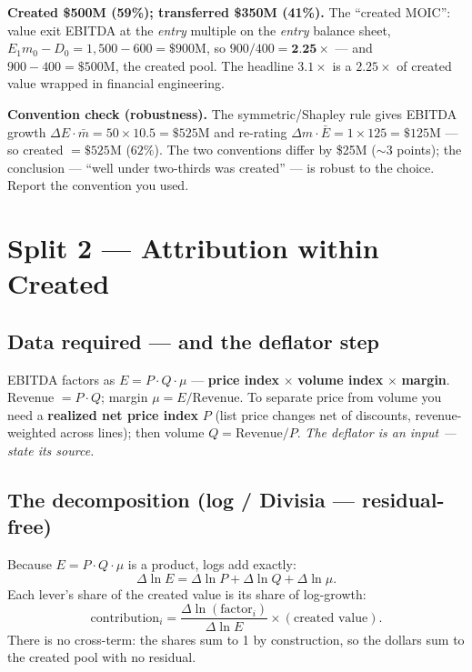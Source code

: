 \documentclass[11pt]{article}
\begin{document}
\textbf{Created \$500M (59\%); transferred \$350M (41\%).} The ``created MOIC'': value exit
EBITDA at the \emph{entry} multiple on the \emph{entry} balance sheet,
$E_1 m_0-D_0=1{,}500-600=\$900\text{M}$, so $900/400=\textbf{2.25}\times$ --- and
$900-400=\$500\text{M}$, the created pool. The headline $3.1\times$ is a $2.25\times$ of
created value wrapped in financial engineering.

\begin{note}
\textbf{Convention check (robustness).} The symmetric/Shapley rule gives EBITDA growth
$\Delta E\cdot\bar m=50\times10.5=\$525\text{M}$ and re-rating $\Delta m\cdot\bar
E=1\times125=\$125\text{M}$ --- so created $=\$525\text{M}$ ($62\%$). The two conventions differ
by \$25M ($\sim$3 points); the conclusion --- ``well under two-thirds was created'' --- is
robust to the choice. Report the convention you used.
\end{note}

\section{Split 2 --- Attribution within Created}

\subsection{Data required --- and the deflator step}
EBITDA factors as $E=P\cdot Q\cdot \mu$ --- \textbf{price index} $\times$ \textbf{volume
index} $\times$ \textbf{margin}. Revenue $=P\cdot Q$; margin $\mu=E/\text{Revenue}$. To
separate price from volume you need a \textbf{realized net price index} $P$ (list price
changes net of discounts, revenue-weighted across lines); then volume $Q=\text{Revenue}/P$.
\emph{The deflator is an input --- state its source.}

\subsection{The decomposition (log / Divisia --- residual-free)}
Because $E=P\cdot Q\cdot\mu$ is a product, logs add exactly:
\[
\Delta\ln E=\Delta\ln P+\Delta\ln Q+\Delta\ln\mu .
\]
Each lever's share of the created value is its share of log-growth:
\[
\text{contribution}_i=\frac{\Delta\ln(\text{factor}_i)}{\Delta\ln E}\times(\text{created value}).
\]
There is no cross-term: the shares sum to 1 by construction, so the dollars sum to the
created pool with no residual.
\end{document}
